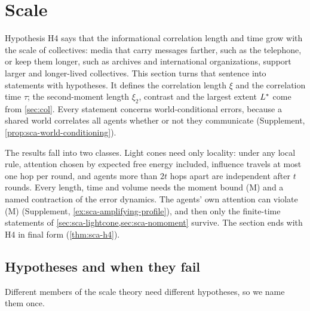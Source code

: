 \section{Scale}\label{sec:sca}

Hypothesis H4 says that the informational correlation length and time grow with the scale of collectives: media that carry messages farther, such as the telephone, or keep them longer, such as archives and international organizations, support larger and longer-lived collectives. This section turns that sentence into statements with hypotheses. It defines the correlation length $\xi$ and the correlation time $\tau$; the second-moment length $\xi_2$, contrast and the largest extent $L^{\ast}$ come from \cref{sec:col}. Every statement concerns world-conditional errors, because a shared world correlates all agents whether or not they communicate (Supplement, \cref{prop:sca-world-conditioning}).

The results fall into two classes. Light cones need only locality: under any local rule, attention chosen by expected free energy included, influence travels at most one hop per round, and agents more than $2t$ hops apart are independent after $t$ rounds. Every length, time and volume needs the moment bound \textup{(M)} and a named contraction of the error dynamics. The agents' own attention can violate \textup{(M)} (Supplement, \cref{ex:sca-amplifying-profile}), and then only the finite-time statements of \cref{sec:sca-lightcone,sec:sca-nomoment} survive. The section ends with H4 in final form (\cref{thm:sca-h4}).

\subsection{Hypotheses and when they fail}\label{sec:sca-hypotheses}

Different members of the scale theory need different hypotheses, so we name them once.

